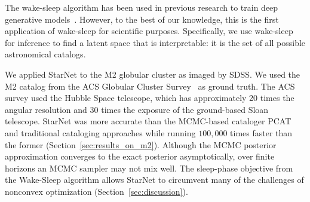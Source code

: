 The wake-sleep algorithm has been used in previous research to train deep generative models~\cite{Hinton1995wake_sleep, bornschein2014reweighted, le2020revisiting}.
However, to the best of our knowledge, this is the first application of wake-sleep for scientific purposes. 
Specifically, we use wake-sleep for inference to find a latent space that is interpretable: it is the set of all possible astronomical catalogs.


We applied StarNet to the M2 globular cluster as imaged by SDSS.
We used the M2 catalog from the ACS Globular Cluster Survey~\cite{Sarajedini_2007} as ground truth. 
The ACS survey used the Hubble Space telescope, 
which has approximately 20 times the angular resolution and 30 times the exposure of the ground-based Sloan telescope. 
StarNet was more accurate than the MCMC-based cataloger PCAT and traditional cataloging approaches while running $100,000$ times faster than the former (Section~\ref{sec:results_on_m2}).
Although the MCMC posterior approximation converges to the exact posterior asymptotically, over finite horizons an MCMC sampler may not mix well. The sleep-phase objective from the Wake-Sleep algorithm allows StarNet to circumvent many of the challenges of nonconvex optimization
(Section~\ref{sec:discussion}).



















